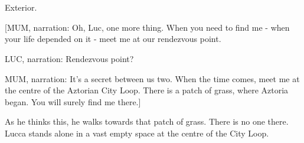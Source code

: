 \documentclass[11pt]{article}
\begin{document}
\ 

\ 

Exterior.

[MUM, narration: Oh, Luc, one more thing.
When you need to find me - when your life depended on it - meet me at our rendezvous point.

LUC, narration: Rendezvous point?

MUM, narration: It's a secret between us two. 
When the time comes, meet me at the centre of the Aztorian City Loop.
There is a patch of grass, where Aztoria began.
You will surely find me there.]

As he thinks this, he walks towards that patch of grass.
There is no one there.
Lucca stands alone in a vast empty space at the centre of the City Loop.
\end{document}
